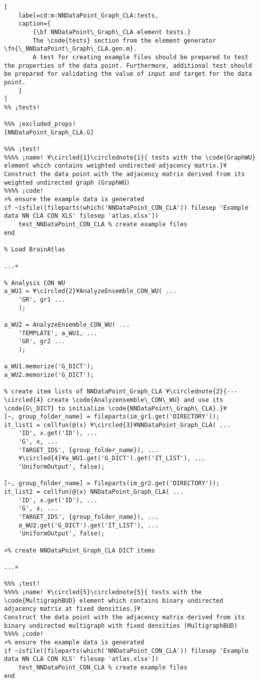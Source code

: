 \documentclass{tufte-handout}
\begin{document}
\begin{lstlisting}[
	label=cd:m:NNDataPoint_Graph_CLA:tests,
	caption={
		{\bf NNDataPoint\_Graph\_CLA element tests.}
		The \code{tests} section from the element generator \fn{\_NNDataPoint\_Graph\_CLA.gen.m}.
		A test for creating example files should be prepared to test the properties of the data point. Furthermore, additional test should be prepared for validating the value of input and target for the data point.
	}
]		
%% ¡tests!

%%% ¡excluded_props!
[NNDataPoint_Graph_CLA.G]

%%% ¡test!
%%%% ¡name! ¥\circled{1}\circlednote{1}{ tests with the \code{GraphWU} element which contains weighted undirected adjacency matrix.}¥
Construct the data point with the adjacency matrix derived from its weighted undirected graph (GraphWU) 
%%%% ¡code!
¤% ensure the example data is generated
if ~isfile([fileparts(which('NNDataPoint_CON_CLA')) filesep 'Example data NN CLA CON XLS' filesep 'atlas.xlsx'])
    test_NNDataPoint_CON_CLA % create example files
end

% Load BrainAtlas

...¤

% Analysis CON WU
a_WU1 = ¥\circled{2}¥AnalyzeEnsemble_CON_WU( ...
    'GR', gr1 ...
    );

a_WU2 = AnalyzeEnsemble_CON_WU( ...
    'TEMPLATE', a_WU1, ...
    'GR', gr2 ...
    );

a_WU1.memorize('G_DICT');
a_WU2.memorize('G_DICT');

% create item lists of NNDataPoint_Graph_CLA ¥\circlednote{2}{---\circled{4} create \code{Analyzensemble\_CON\_WU} and use its \code{G\_DICT} to initialize \code{NNDataPoint\_Graph\_CLA}.}¥
[~, group_folder_name] = fileparts(im_gr1.get('DIRECTORY'));
it_list1 = cellfun(@(x) ¥\circled{3}¥NNDataPoint_Graph_CLA( ...
    'ID', x.get('ID'), ...
    'G', x, ...
    'TARGET_IDS', {group_folder_name}), ...
    ¥\circled{4}¥a_WU1.get('G_DICT').get('IT_LIST'), ...
    'UniformOutput', false);

[~, group_folder_name] = fileparts(im_gr2.get('DIRECTORY'));
it_list2 = cellfun(@(x) NNDataPoint_Graph_CLA( ...
    'ID', x.get('ID'), ...
    'G', x, ...
    'TARGET_IDS', {group_folder_name}), ...
    a_WU2.get('G_DICT').get('IT_LIST'), ...
    'UniformOutput', false);

¤% create NNDataPoint_Graph_CLA DICT items

...¤

%%% ¡test!
%%%% ¡name! ¥\circled{5}\circlednote{5}{ tests with the \code{MultigraphBUD} element which contains binary undirected adjacency matrix at fixed densities.}¥
Construct the data point with the adjacency matrix derived from its binary undirected multigraph with fixed densities (MultigraphBUD)
%%%% ¡code!
¤% ensure the example data is generated
if ~isfile([fileparts(which('NNDataPoint_CON_CLA')) filesep 'Example data NN CLA CON XLS' filesep 'atlas.xlsx'])
    test_NNDataPoint_CON_CLA % create example files
end


\end{lstlisting}
\end{document}
